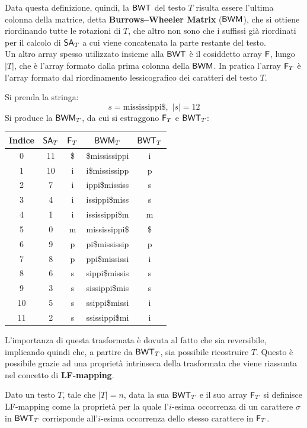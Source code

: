 Data questa definizione, quindi, la $\mbox{\rm {\sf BWT}}$ del testo $T$ risulta essere
l'ultima colonna della matrice, detta \textbf{Burrows--Wheeler Matrix} ($\mbox{\rm {\sf BWM}}$),
che si ottiene riordinando tutte le  
rotazioni di $T$, che altro non sono che i suffissi già riordinati per
il calcolo di $\mbox{\rm {\sf SA}}_T$ a cui viene concatenata la parte restante del
testo.\\
Un altro array spesso utilizzato insieme alla $\mbox{\rm {\sf BWT}}$ è il cosiddetto
array $\mbox{\rm {\sf F}}$, lungo $|T|$, che è l'array formato
dalla prima colonna della $\mbox{\rm {\sf BWM}}$. In pratica l'array $\mbox{\rm {\sf F}}_T$ è l'array formato
dal riordinamento  
lessicografico dei caratteri del testo $T$.
\begin{esempio}
  Si prenda la stringa:
  \[s=\mbox{mississippi\$},\,\,|s|=12\]
  Si produce la $\mbox{\rm {\sf BWM}}_T$, da cui si estraggono $\mbox{\rm {\sf F}}_T$ e $\mbox{\rm {\sf BWT}}_T$:
  \begin{table}[H]
    \centering
    \footnotesize
    \begin{tabular}{c|c|c|c|c} 
      \textbf{Indice} & $\mbox{\rm {\sf SA}}_T$ & $\mbox{\rm {\sf F}}_T$ & $\mbox{\rm {\sf BWM}}_T$
      & $\mbox{\rm {\sf BWT}}_T$\\ 
      \hline
      0 & 11 & \$ & \$mississippi & i\\
      1 & 10 & i & i\$mississipp & p\\
      2 & 7 & i & ippi\$mississ & s\\
      3 & 4 & i & issippi\$miss & s\\
      4 & 1 & i & ississippi\$m & m\\
      5 & 0 & m & mississippi\$ & \$\\
      6 & 9 & p & pi\$mississip & p\\
      7 & 8 & p & ppi\$mississi & i\\
      8 & 6 & s & sippi\$missis & s\\
      9 & 3 & s & sissippi\$mis & s\\
      10 & 5 & s & ssippi\$missi & i\\
      11 & 2 & s & ssissippi\$mi & i\\
    \end{tabular}
  \end{table}
\end{esempio}
L'importanza di questa trasformata è dovuta al fatto che sia
reversibile, implicando quindi che, a partire da $\mbox{\rm {\sf BWT}}_T$, sia possibile
ricostruire $T$. Questo è possibile grazie ad una proprietà intrinseca della
trasformata che viene riassunta nel concetto di \textbf{LF-mapping}.
\begin{definizione}
  Dato un testo $T$, tale che $|T|=n$, data la sua $\mbox{\rm {\sf BWT}}_T$ e il suo array
  $\mbox{\rm {\sf F}}_T$ 
  si definisce LF-mapping come la proprietà per la quale l'$i$-esima
  occorrenza di un carattere $\sigma$ in $\mbox{\rm {\sf BWT}}_T$ corrisponde all'$i$-esima
  occorrenza dello stesso carattere in $\mbox{\rm {\sf F}}_T$.
\end{definizione}
